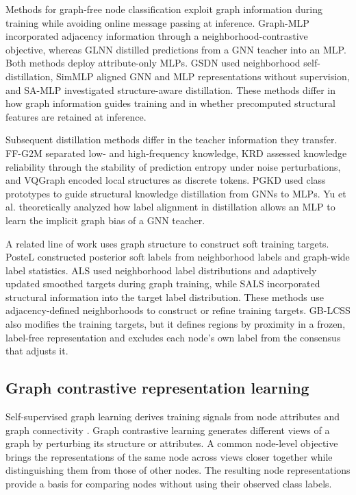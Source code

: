 \documentclass[times,review,10pt]{elsarticle}
\theoremstyle{definition}
\theoremstyle{plain}
\begin{document}
Methods for graph-free node classification exploit graph information during training while avoiding online message passing at inference. Graph-MLP \cite{ref3} incorporated adjacency information through a neighborhood-contrastive objective, whereas GLNN \cite{ref4} distilled predictions from a GNN teacher into an MLP. Both methods deploy attribute-only MLPs. GSDN \cite{ref40} used neighborhood self-distillation, SimMLP \cite{ref41} aligned GNN and MLP representations without supervision, and SA-MLP \cite{ref44} investigated structure-aware distillation. These methods differ in how graph information guides training and in whether precomputed structural features are retained at inference.

Subsequent distillation methods differ in the teacher information they transfer. FF-G2M \cite{ref45} separated low- and high-frequency knowledge, KRD \cite{ref46} assessed knowledge reliability through the stability of prediction entropy under noise perturbations, and VQGraph \cite{ref47} encoded local structures as discrete tokens. PGKD \cite{ref48} used class prototypes to guide structural knowledge distillation from GNNs to MLPs. Yu et al. \cite{ref53} theoretically analyzed how label alignment in distillation allows an MLP to learn the implicit graph bias of a GNN teacher.

A related line of work uses graph structure to construct soft training targets. PosteL \cite{ref54} constructed posterior soft labels from neighborhood labels and graph-wide label statistics. ALS \cite{ref55} used neighborhood label distributions and adaptively updated smoothed targets during graph training, while SALS \cite{ref56} incorporated structural information into the target label distribution. These methods use adjacency-defined neighborhoods to construct or refine training targets. GB-LCSS also modifies the training targets, but it defines regions by proximity in a frozen, label-free representation and excludes each node's own label from the consensus that adjusts it.

\subsection{Graph contrastive representation learning}\label{sec:2.4}

Self-supervised graph learning derives training signals from node attributes and graph connectivity \cite{ref57}. Graph contrastive learning generates different views of a graph by perturbing its structure or attributes. A common node-level objective brings the representations of the same node across views closer together while distinguishing them from those of other nodes. The resulting node representations provide a basis for comparing nodes without using their observed class labels.
\end{document}
